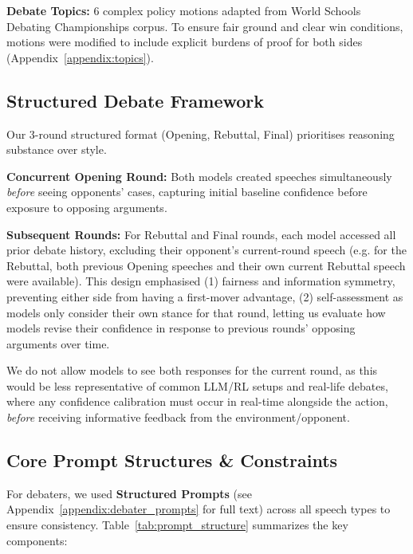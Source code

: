 \documentclass{article}
\begin{document}
\textbf{Debate Topics:} 6 complex policy motions adapted from World Schools Debating Championships corpus. To ensure fair ground and clear win conditions, motions were modified to include explicit burdens of proof for both sides (Appendix~\ref{appendix:topics}).

\subsection{Structured Debate Framework}
\label{subsec:debate_framework}

Our 3-round structured format (Opening, Rebuttal, Final) prioritises reasoning substance over style.

\textbf{Concurrent Opening Round:} Both models created speeches simultaneously \textit{before} seeing opponents' cases, capturing initial baseline confidence before exposure to opposing arguments.

\textbf{Subsequent Rounds:} For Rebuttal and Final rounds, each model accessed all prior debate history, excluding their opponent's current-round speech (e.g. for the Rebuttal, both previous Opening speeches and their own current Rebuttal speech were available). This design emphasised (1) fairness and information symmetry, preventing either side from having a first-mover advantage, (2) self-assessment as models only consider their own stance for that round, letting us evaluate how models revise their confidence in response to previous rounds' opposing arguments over time.

We do not allow models to see both responses for the current round, as this would be less representative of common LLM/RL setups and real-life debates, where any confidence calibration must occur in real-time alongside the action, \textit{before} receiving informative feedback from the environment/opponent.

\subsection{Core Prompt Structures \& Constraints}
\label{subsec:prompts}
For debaters, we used \textbf{Structured Prompts} (see Appendix~\ref{appendix:debater_prompts} for full text) across all speech types to ensure consistency. Table~\ref{tab:prompt_structure} summarizes the key components:
\end{document}
